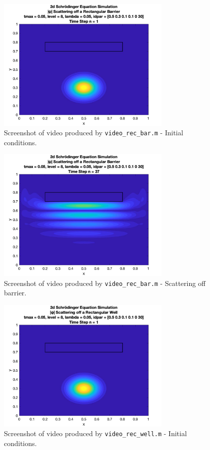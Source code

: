 \documentclass[10pt]{article}
\def\code#1{\texttt{#1}} %
\begin{document}
\begin{figure}[H]
\centering
\includegraphics[width=0.75\textwidth]{problem2/rec_bar_1.png}
\caption{Screenshot of video produced by \code{video\_rec\_bar.m} - Initial conditions.}
\end{figure}

\begin{figure}[H]
\centering
\includegraphics[width=0.75\textwidth]{problem2/rec_bar_2.png}
\caption{Screenshot of video produced by \code{video\_rec\_bar.m} - Scattering off barrier.}
\end{figure}

\begin{figure}[H]
\centering
\includegraphics[width=0.75\textwidth]{problem2/rec_well_1.png}
\caption{Screenshot of video produced by \code{video\_rec\_well.m} - Initial conditions.}
\end{figure}
\end{document}
